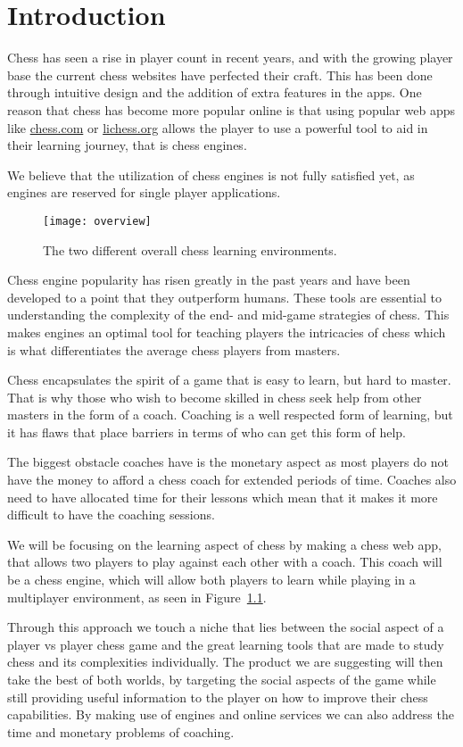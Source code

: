 \chapter{Introduction}\label{ch:introduction}

Chess has seen a rise in player count in recent years, and with the growing player base the current chess websites have
perfected their craft.
This has been done through intuitive design and the addition of extra features in the apps.
One reason that chess has become more popular online is that using popular web apps like \url{chess.com} or
\url{lichess.org} allows the player to use a powerful tool to aid in their learning journey, that is chess engines.

We believe that the utilization of chess engines is not fully satisfied yet, as engines are reserved for single player
applications.

\begin{figure}[htb]
    \centering
    \texttt{[image: overview]}
    \caption{The two different overall chess learning environments.}\label{fig:project-overview}
\end{figure}

Chess engine popularity has risen greatly in the past years and have been developed to a point that they
outperform humans.
These tools are essential to understanding the complexity of the end- and mid-game strategies of chess.
This makes engines an optimal tool for teaching players the intricacies of chess which is what
differentiates the average chess players from masters.

Chess encapsulates the spirit of a game that is easy to learn, but hard to master.
That is why those who wish to become skilled in chess seek help from other masters in the form of a coach.
Coaching is a well respected form of learning, but it has flaws that place barriers in terms of who can get this form of
help.

The biggest obstacle coaches have is the monetary aspect as most players do not have the money to afford a chess coach
for extended periods of time.
Coaches also need to have allocated time for their lessons which mean that it makes it more difficult to have the
coaching sessions.

We will be focusing on the learning aspect of chess by making a chess web app, that allows two players to play against
each other with a coach.
This coach will be a chess engine, which will allow both players to learn while playing in a multiplayer environment, as
seen in Figure~\ref{fig:project-overview}.

Through this approach we touch a niche that lies between the social aspect of a player vs player chess game and the
great learning tools that are made to study chess and its complexities individually.
The product we are suggesting will then take the best of both worlds, by targeting the social aspects of the game while
still providing useful information to the player on how to improve their chess capabilities.
By making use of engines and online services we can also address the time and monetary problems of coaching.
